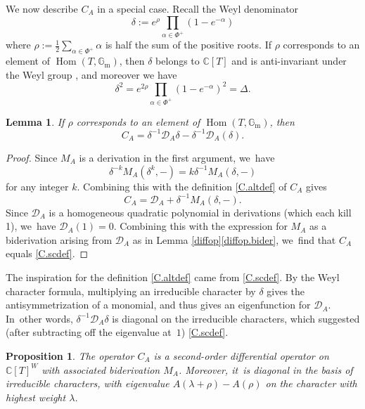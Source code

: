 \documentclass[JEP,XML,SOM,Unicode,NoFloatCountersInSection,published]{cedram}
\newtheorem{lem}[equation]{Lemma}
\newtheorem{prop}[equation]{Proposition}
\theoremstyle{definition}
\newcommand{\C}{\mathbb{C}}
\newcommand{\Gm}{\mathbb{G}_{\mathrm{m}}}
\newcommand{\mcD}{\mathcal{D}}
\newcommand{\emptyslot}{{-}}
\DeclareMathOperator{\Hom}{Hom}
\begin{document}
We now describe $C_A$ in a special case.
Recall the Weyl denominator
\[
\delta := e^\rho\prod_{\alpha\in \Phi^+} (1-e^{-\alpha})
\]
where $\rho := \tfrac12 \sum_{\alpha \in \Phi^+} \alpha$ is half the sum of the positive roots. If $\rho$ corresponds to an element of $\Hom(T, \Gm)$, then $\delta$ belongs to $\C[T]$ and is anti-invariant under the Weyl group \cite[\S{VI.3.3}, Prop.\,2(i)]{Bou:g4}, and moreover we have
\[
\delta^2=e^{2\rho} \prod_{\alpha\in \Phi^+}(1-e^{-\alpha})^2
= \Delta.
\]

\begin{lem}
If $\rho$ corresponds to an element of $\Hom(T, \Gm)$, then
\begin{equation} \label{C.scdef}
C_A = \delta^{-1} \mcD_A \delta - \delta^{-1}\mcD_A(\delta).
\end{equation}
\end{lem}

\begin{proof}
Since $M_A$ is a derivation in the first argument, we~have
\[
\delta^{-k} M_A(\delta^k,\emptyslot)
=
k \delta^{-1} M_A(\delta,\emptyslot)
\]
for any integer $k$. Combining this with the definition \eqref{C.altdef} of $C_A$ gives
\[
C_A = \mcD_A + \delta^{-1} M_A(\delta, \emptyslot).
\]
Since $\mcD_A$ is a homogeneous quadratic polynomial in derivations (which each kill 1), we~have $\mcD_A(1)=0$. Combining this with the expression for $M_A$ as a biderivation arising from $\mcD_A$ as in Lemma \ref{diffop}\eqref{diffop.bider}, we~find that $C_A$ equals \eqref{C.scdef}.
\end{proof}

The inspiration for the definition \eqref{C.altdef} came from \eqref{C.scdef}.
By the Weyl character formula, multiplying an irreducible character by $\delta$ gives
the antisymmetrization of a monomial, and thus gives an eigenfunction for
$\mcD_A$. In~other words, $\delta^{-1}\mcD_A\delta$ is diagonal on the
irreducible characters, which suggested (after subtracting off the eigenvalue at~$1$) \eqref{C.scdef}.

\begin{prop}
The operator $C_A$ is a second-order differential operator on $\C[T]^W$ with
associated biderivation $M_A$. Moreover, it~is diagonal in the basis of
irreducible characters, with eigenvalue $A(\lambda+\rho)-A(\rho)$ on the
character with highest weight $\lambda$.
\end{prop}
\end{document}
